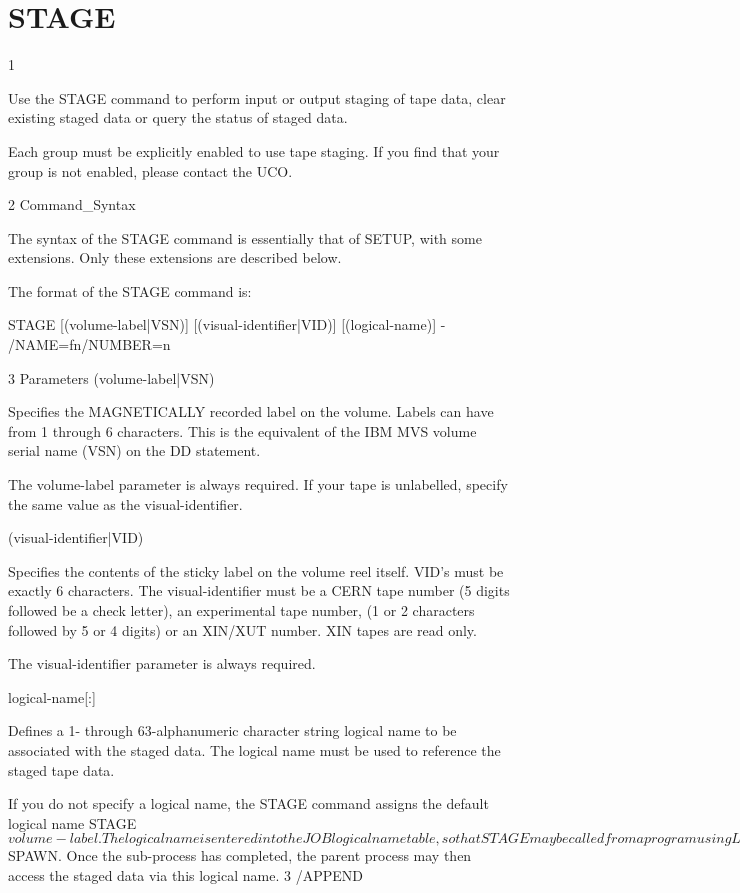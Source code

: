 \section{STAGE}
\begin{XMP}
1 

Use the STAGE command to perform input or output staging of tape
data, clear existing staged data or query the status of staged
data.

Each group must be explicitly enabled to use tape staging. If you
find that your group is not enabled, please contact the UCO.

2 Command_Syntax

The syntax of the STAGE command is essentially that of SETUP, with some
extensions. Only these extensions are described below.

The format of the STAGE command is:

STAGE [(volume-label|VSN)] [(visual-identifier|VID)] [(logical-name)] -
  /NAME=fn/NUMBER=n

3 Parameters
 (volume-label|VSN)

Specifies the MAGNETICALLY recorded label on the volume.
Labels can have from 1 through 6 characters. This is the
equivalent of the IBM MVS volume serial name (VSN) on the DD statement.

The volume-label parameter is  always required. If your tape is unlabelled,
specify the same value as the visual-identifier.

 (visual-identifier|VID)

Specifies the contents of the sticky label on the volume reel itself.
VID's must be exactly 6 characters.
The visual-identifier must be a CERN tape number (5 digits followed
be a check letter), an experimental tape number, (1 or 2 characters
followed by 5 or 4 digits) or an XIN/XUT number.
XIN tapes are read only.

The visual-identifier parameter is  always required.

 logical-name[:]

Defines a 1- through  63-alphanumeric  character  string  logical
name to be associated with the staged data.
The logical name must be used to reference the staged tape data.

If you do not specify a logical name, the STAGE  command  assigns
the  default  logical  name  STAGE$volume-label.

The logical name is entered into the JOB logical name table, so that
STAGE may be called from a program using LIB$SPAWN. Once the sub-process
has completed, the parent process may then access the staged data via
this logical name.
3 /APPEND


\end{XMP}
